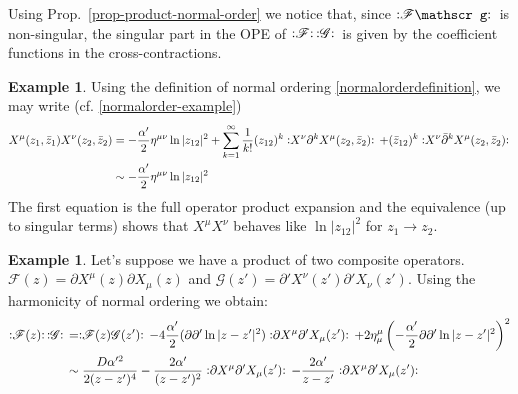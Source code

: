 \documentclass{report}
\theoremstyle{plain}
\theoremstyle{definition}
\newtheorem{example}[theorem]{Example}
\theoremstyle{remark}
\newcommand{\FR}[2]{\frac{#1}{#2}}
\newcommand{\ms}{\mathscr}
\newcommand{\sg}{\sigma}
\newcommand{\di}{\partial}
\newcommand{\NO}[1]{\vcentcolon\mathrel{#1}\vcentcolon\,}
\begin{document}
Using Prop.~\ref{prop-product-normal-order} we notice that, since
$\NO{\ms F\ms g}$ is non-singular, the singular
part in the OPE of $\NO{\ms F}\NO{\ms G}$ is given by the coefficient
functions in the cross-contractions.


\begin{example} Using the definition of normal ordering
\eqref{normalorderdefinition}, we may write (cf.
\eqref{normalorder-example})
\begin{align*}
    X^\mu(z_1,\bar z_1)X^\nu(z_2,\bar z_2) &=
    -\FR{\alpha'}{2}\eta^{\mu\nu}\ln|z_{12}|^2 +\sum_{k=1}^\infty \FR{1}{k!} 
    (z_{12})^k \NO{X^\nu\di^k X^\mu(z_2,\bar z_2)}
    +(\bar z_{12})^k \NO{X^\nu\bar\di^k X^\mu(z_2,\bar z_2)}\\
    &\sim -\FR{\alpha'}{2}\eta^{\mu\nu}\ln|z_{12}|^2 
\end{align*}
The first equation is the full operator product expansion and the
equivalence (up to singular terms) shows that $X^\mu X^\nu$ behaves like
$\ln|z_{12}|^2$ for $z_1\to z_2$.
\end{example}
\begin{example} Let's suppose we have a product of two composite operators.
$\ms F(z) = \di X^\mu(z)\di X_\mu(z)$ and $\ms G(z') = \di'
X^\nu(z')\di'X_\nu(z')$.  Using the harmonicity of normal ordering we
obtain:
\begin{align*}
\NO{\ms F(z)}\NO{\ms G} &= \NO{\ms F(z)\ms G(z')} - 4 \FR{\alpha'}{2}
(\di\di' \ln|z-z'|^2) \NO{\di X^\mu \di' X_\mu(z')}
+2\eta^\mu_\mu \left( -\FR{\alpha'}{2}\di\di'\ln|z-z'|^2 \right)^2\\
&\sim \FR{D\alpha'^2}{2(z-z')^4}-\FR{2\alpha'}{(z-z')^2}\NO{\di X^\mu \di'
X_\mu(z')} - \FR{2\alpha'}{z-z'} \NO{\di X^\mu \di' X_\mu(z')}
\end{align*}
\end{example}
\end{document}
